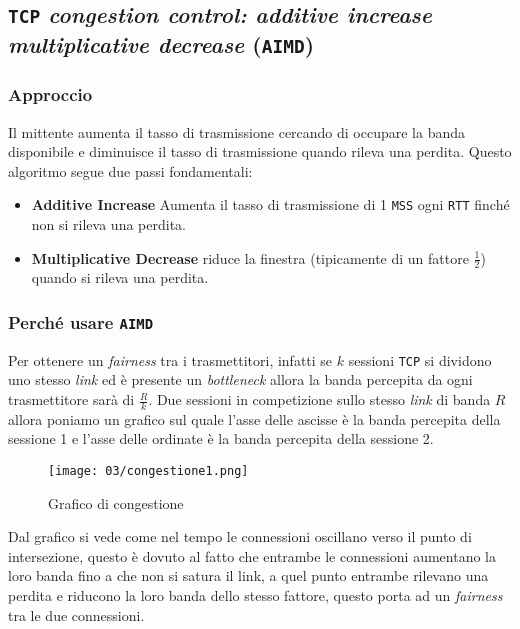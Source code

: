     \subsection{\texttt{TCP} \textit{congestion control: additive increase multiplicative decrease} (\texttt{AIMD})}
        \subsubsection{Approccio}
            Il mittente aumenta il tasso di trasmissione cercando di occupare la banda disponibile e diminuisce il tasso di trasmissione quando rileva una perdita. Questo algoritmo segue due passi fondamentali: \begin{itemize}
                \item \textbf{Additive Increase} Aumenta il tasso di trasmissione di 1 \texttt{MSS} ogni \texttt{RTT} finché non si rileva una perdita.
                \item \textbf{Multiplicative Decrease} riduce la finestra (tipicamente di un fattore $ \frac{1}{2} $) quando si rileva una perdita.
            \end{itemize}
        \subsubsection{Perché usare \texttt{AIMD}}
            Per ottenere un \textit{fairness} tra i trasmettitori, infatti se $ k $ sessioni \texttt{TCP} si dividono uno stesso \textit{link} ed è presente un \textit{bottleneck} allora la banda percepita da ogni trasmettitore sarà di $ \frac{R}{k} $.\newline
            Due sessioni in competizione sullo stesso \textit{link} di banda $ R $ allora poniamo un grafico sul quale l'asse delle ascisse è la banda percepita della sessione 1 e l'asse delle ordinate è la banda percepita della sessione 2. 
            \begin{figure}[H]
                \centering
                \texttt{[image: 03/congestione1.png]}
                \caption{Grafico di congestione}
            \end{figure}
            Dal grafico si vede come nel tempo le connessioni oscillano verso il punto di intersezione, questo è dovuto al fatto che entrambe le connessioni aumentano la loro banda fino a che non si satura il link, a quel punto entrambe rilevano una perdita e riducono la loro banda dello stesso fattore, questo porta ad un \textit{fairness} tra le due connessioni.
